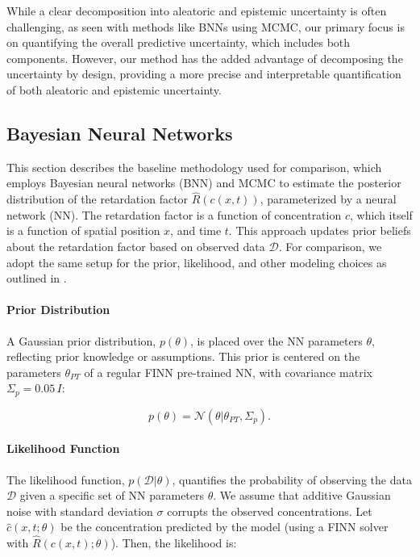 While a clear decomposition into aleatoric and epistemic uncertainty is often challenging, as seen with methods like BNNs using MCMC, our primary focus is on quantifying the overall predictive uncertainty, which includes both components. However, our method has the added advantage of decomposing the uncertainty by design, providing a more precise and interpretable quantification of both aleatoric and epistemic uncertainty.



\subsection{Bayesian Neural Networks}
\label{sec:bayes_nn}
This section describes the baseline methodology used for comparison, which employs Bayesian neural networks (BNN) and MCMC to estimate the posterior distribution of the retardation factor $\hat{R}(c(x,t))$, parameterized by a neural network (NN). The retardation factor is a function of concentration $c$, which itself is a function of spatial position $x$, and time $t$. This approach updates prior beliefs about the retardation factor based on observed data $\mathcal{D}$.
For comparison, we adopt the same setup for the prior, likelihood, and other modeling choices as outlined in \cite{finn}.

\paragraph{Prior Distribution}

A Gaussian prior distribution, $p(\theta)$, is placed over the NN parameters $\theta$, reflecting prior knowledge or assumptions. This prior is centered on the parameters $\theta_{PT}$ of a regular FINN pre-trained NN, with covariance matrix $\Sigma_p = 0.05 \, I$:


\begin{equation*}
p(\theta) = \mathcal{N}(\theta | \theta_{PT}, \Sigma_p) .
\end{equation*}

\paragraph{Likelihood Function}

The likelihood function, $p(\mathcal{D} | \theta)$, quantifies the probability of observing the data $\mathcal{D}$ given a specific set of NN parameters $\theta$. We assume that additive Gaussian noise with standard deviation $\sigma$ corrupts the observed concentrations. Let $\hat{c}(x,t;\theta)$ be the concentration predicted by the model (using a FINN solver with $\hat{R}(c(x,t);\theta)$). Then, the likelihood is:

